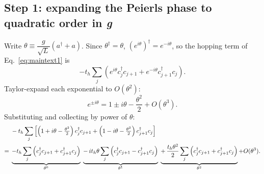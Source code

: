 \documentclass[../../main.tex]{subfiles}
\begin{document}
\subsection*{Step 1: expanding the Peierls phase to quadratic order in \textit{g}}
\label{sec:step1-expansion}

Write $\theta\equiv\dfrac{g}{\sqrt L}(a^\dagger+a)$. Since $\theta^\dagger=\theta$, $(e^{i\theta})^\dagger
=e^{-i\theta}$, so the hopping term of Eq.~\eqref{eq:maintext1} is
\begin{equation}
-t_h\sum_j\left(e^{i\theta}c_j^\dagger c_{j+1}+e^{-i\theta}c_{j+1}^\dagger c_j\right).
\end{equation}
Taylor-expand each exponential to $O(\theta^2)$:
\begin{equation}
e^{\pm i\theta}=1\pm i\theta-\frac{\theta^2}{2}+O(\theta^3).
\end{equation}
Substituting and collecting by power of $\theta$:
\begin{align}
&-t_h\sum_j\left[\left(1+i\theta-\tfrac{\theta^2}2\right)c_j^\dagger c_{j+1}
+\left(1-i\theta-\tfrac{\theta^2}2\right)c_{j+1}^\dagger c_j\right]\notag\\
=\;&\underbrace{-t_h\sum_j\left(c_j^\dagger c_{j+1}+c_{j+1}^\dagger c_j\right)}_{\theta^0}
\;\underbrace{-\,it_h\theta\sum_j\left(c_j^\dagger c_{j+1}-c_{j+1}^\dagger c_j\right)}_{\theta^1}
\;\underbrace{+\,\frac{t_h\theta^2}{2}\sum_j\left(c_j^\dagger c_{j+1}+c_{j+1}^\dagger c_j\right)}_{\theta^2}
+O(\theta^3). \label{eq:taylorexpand}
\end{align}
\end{document}
